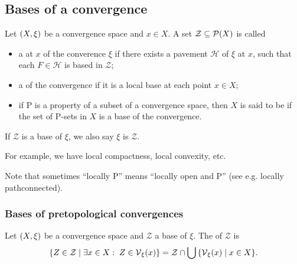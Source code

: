 \subsection{Bases of a convergence}
\begin{definition}
Let $\sSet{X,\xi}$ be a convergence space and $x\in X$. A set $\mathcal{Z}\subseteq \operatorname{\mathcal{P}}(X)$ is called
\begin{itemize}
\item a  at $x$ of the converence $\xi$ if there exists a pavement $\mathcal{H}$ of $\xi$ at $x$, such that each $F\in\mathcal{H}$ is based in $\mathcal{Z}$;
\item a  of the convergence if it is a local base at each point $x\in X$;
\item if $\mathrm{P}$ is a property of a subset of a convergence space, then $X$ is said to be  if the set of $\mathrm{P}$-sets in $X$ is a base of the convergence. 
\end{itemize}
If $\mathcal{Z}$ is a base of $\xi$, we also say $\xi$ is  $\mathcal{Z}$.
\end{definition}
For example, we have local compactness, local convexity, etc.

Note that sometimes ``locally $\mathrm{P}$'' means ``locally open and $\mathrm{P}$'' (see e.g. locally pathconnected).  

\subsubsection{Bases of pretopological convergences}
\begin{definition}
Let $\sSet{X,\xi}$ be a convergence space and $\mathcal{Z}$ a base of $\xi$. The  of $\mathcal{Z}$ is
\[ \setbuilder{Z\in \mathcal{Z}}{\exists x\in X: \; Z\in \vicinity_\xi(x)} = \mathcal{Z}\cap \bigcup\setbuilder{\vicinity_\xi(x)}{x\in X}. \]
\end{definition}

